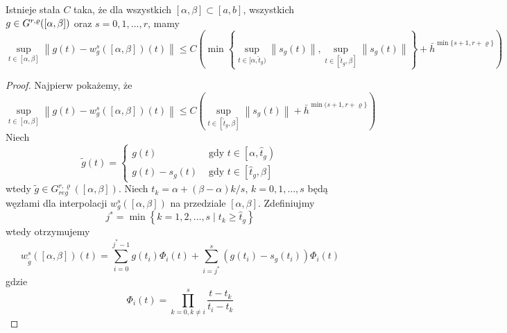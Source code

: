 \documentclass[oik, pdftex, robocza, man]{mgrwms}
\begin{document}
    \begin{lemma} \label{lem:1}
        Istnieje stała $C$ taka, że dla wszystkich $[\alpha, \beta] \subset [a, b]$, wszystkich $g \in G^{r,\varrho}([\alpha,\beta])$ oraz $s=0,1,\dots,r$, mamy
        \begin{equation*}
            \sup _{t \in[\alpha, \beta]}\left\|g(t)-w_{g}^{s}([\alpha, \beta])(t)\right\| \leq 
                C\left(\min \left\{\sup_{t \in[\alpha, \hat{t}_{g})}\left\|s_{g}(t)\right\|, \sup _{t \in [\hat{t}_{g}, \beta]}\left\|s_{g}(t)\right\|\right\}+\bar{h}^{\min \{s+1, r+\varrho\}}\right)
        \end{equation*}
    \end{lemma}
    \begin{proof}
        Najpierw pokażemy, że
        \begin{equation} \label{eq:7}
            \sup _{t \in[\alpha, \beta]}\left\|g(t)-w_{g}^{s}([\alpha, \beta])(t)\right\| \leq C\left(\sup _{t \in\left[\hat{t}_{g}, \beta\right]}\left\|s_{g}(t)\right\|+\bar{h}^{\min (s+1, r+\varrho\}}\right)
        \end{equation}
        Niech
        \begin{equation} \label{eq:8}
            \tilde{g}(t)= \begin{cases}
                g(t)            & \text { gdy } t \in\left[\alpha, \hat{t}_{g}\right) \\ 
                g(t)-s_{g}(t)   & \text { gdy } t \in\left[\hat{t}_{g}, \beta\right]\end{cases}
        \end{equation}
        wtedy $\tilde{g} \in G_{reg}^{r, \varrho}([\alpha, \beta])$. Niech $t_{k}=\alpha+(\beta-\alpha) k / s$, $k=0,1, \ldots, s$ będą węzłami dla interpolacji $w_{g}^{s}([\alpha, \beta])$ na przedziale $[\alpha, \beta]$. Zdefiniujmy
        \begin{equation} \label{eq:9}
            j^{*}=\min \left\{k=1,2, \ldots, s \mid t_{k} \geq \hat{t}_{g}\right\}            
        \end{equation}
        wtedy otrzymujemy
        \begin{equation} \label{eq:10}
            w_{\tilde{g}}^{s}([\alpha, \beta])(t)=\sum_{i=0}^{j^{*}-1} g\left(t_{i}\right) \Phi_{i}(t)+\sum_{i=j^{*}}^{s}\left(g\left(t_{i}\right)-s_{g}\left(t_{i}\right)\right) \Phi_{i}(t)            
        \end{equation}
        gdzie
        \begin{equation*}
            \Phi_{i}(t)=\prod_{k=0, k \neq i}^{s} \frac{t-t_{k}}{t_{i}-t_{k}}

\end{equation*}
\end{proof}
\end{document}
